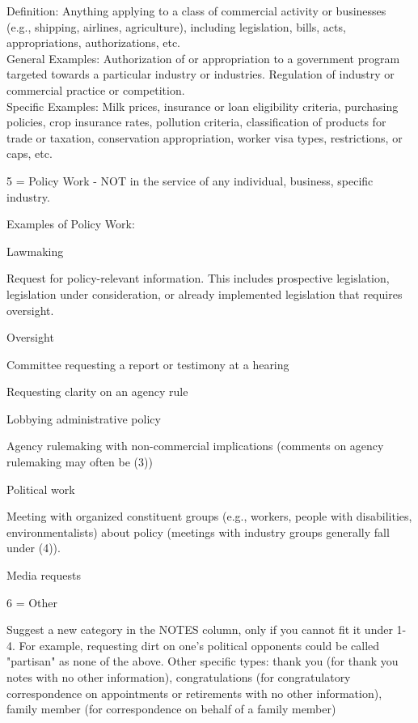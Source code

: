 \documentclass[12pt]{article}
\newenvironment{tight_itemize}{
\begin{itemize}
 \setlength{\itemsep}{0pt}
 \setlength{\parskip}{0pt}
 }{\end{itemize}}
\begin{document}
\hfill\begin{minipage}{\dimexpr\textwidth-2cm}
Definition: Anything applying to a class of commercial activity or businesses (e.g., shipping, airlines, agriculture), including legislation, bills, acts, appropriations, authorizations, etc. \\
General Examples: Authorization of or appropriation to a government program targeted towards a particular industry or industries. Regulation of industry or commercial practice or competition.\\
Specific Examples: Milk prices, insurance or loan eligibility criteria, purchasing policies, crop insurance rates, pollution criteria, classification of products for trade or taxation, conservation appropriation, worker visa types, restrictions, or caps, etc.\\
\end{minipage}
 
5 = Policy Work - NOT in the service of any individual, business, specific industry.\\

\hfill\begin{minipage}{\dimexpr\textwidth-2cm}
Examples of Policy Work: 
 \begin{tight_itemize} 
 \item Lawmaking 
\item Request for policy-relevant information. This includes prospective legislation, legislation under consideration, or already implemented legislation that requires oversight.  
\item Oversight
\item Committee requesting a report or testimony at a hearing
\item Requesting clarity on an agency rule
\item Lobbying administrative policy
\item Agency rulemaking with non-commercial implications (comments on agency rulemaking may often be (3)) 
\item Political work
\item Meeting with organized constituent groups (e.g., workers, people with disabilities, environmentalists) about policy (meetings with industry groups generally fall under (4)).
\item Media requests
 \end{tight_itemize} 
\end{minipage}
\bigskip


6 = Other \\

\hfill\begin{minipage}{\dimexpr\textwidth-2cm}
	Suggest a new category in the NOTES column, only if you cannot fit it under 1-4. For example, requesting dirt on one's political opponents could be called "partisan" as none of the above. Other specific types: thank you (for thank you notes with no other information), congratulations (for congratulatory correspondence on appointments or retirements with no other information), family member (for correspondence on behalf of a family member) \\
\end{minipage}
\end{document}
